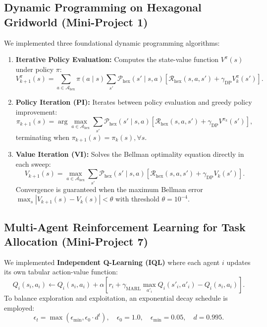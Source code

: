 \documentclass[11pt,a4paper]{article}
\begin{document}
\subsection{Dynamic Programming on Hexagonal Gridworld (Mini-Project 1)}
We implemented three foundational dynamic programming algorithms:
\begin{enumerate}
    \item \textbf{Iterative Policy Evaluation:} Computes the state-value function $V^\pi(s)$ under policy $\pi$:
    \begin{equation}
        V_{k+1}^\pi(s) = \sum_{a \in \mathcal{A}_{\text{hex}}} \pi(a \mid s) \sum_{s'} \mathcal{P}_{\text{hex}}(s' \mid s, a) \left[ \mathcal{R}_{\text{hex}}(s, a, s') + \gamma_{\text{DP}} V_k^\pi(s') \right].
    \end{equation}
    \item \textbf{Policy Iteration (PI):} Iterates between policy evaluation and greedy policy improvement:
    \begin{equation}
        \pi_{k+1}(s) = \arg\max_{a \in \mathcal{A}_{\text{hex}}} \sum_{s'} \mathcal{P}_{\text{hex}}(s' \mid s, a) \left[ \mathcal{R}_{\text{hex}}(s, a, s') + \gamma_{\text{DP}} V^{\pi_k}(s') \right],
    \end{equation}
    terminating when $\pi_{k+1}(s) = \pi_k(s), \forall s$.
    \item \textbf{Value Iteration (VI):} Solves the Bellman optimality equation directly in each sweep:
    \begin{equation}
        V_{k+1}(s) = \max_{a \in \mathcal{A}_{\text{hex}}} \sum_{s'} \mathcal{P}_{\text{hex}}(s' \mid s, a) \left[ \mathcal{R}_{\text{hex}}(s, a, s') + \gamma_{\text{DP}} V_k(s') \right].
    \end{equation}
    Convergence is guaranteed when the maximum Bellman error $\max_s |V_{k+1}(s) - V_k(s)| < \theta$ with threshold $\theta = 10^{-4}$.
\end{enumerate}

\subsection{Multi-Agent Reinforcement Learning for Task Allocation (Mini-Project 7)}
We implemented \textbf{Independent Q-Learning (IQL)} where each agent $i$ updates its own tabular action-value function:
\begin{equation}
    Q_i(s_i, a_i) \leftarrow Q_i(s_i, a_i) + \alpha \left[ r_i + \gamma_{\text{MARL}} \max_{a'_i} Q_i(s'_i, a'_i) - Q_i(s_i, a_i) \right].
\end{equation}
To balance exploration and exploitation, an exponential decay schedule is employed:
\begin{equation}
    \epsilon_t = \max\left( \epsilon_{\min}, \epsilon_0 \cdot d^t \right), \quad \epsilon_0 = 1.0, \quad \epsilon_{\min} = 0.05, \quad d = 0.995.
\end{equation}
\end{document}
